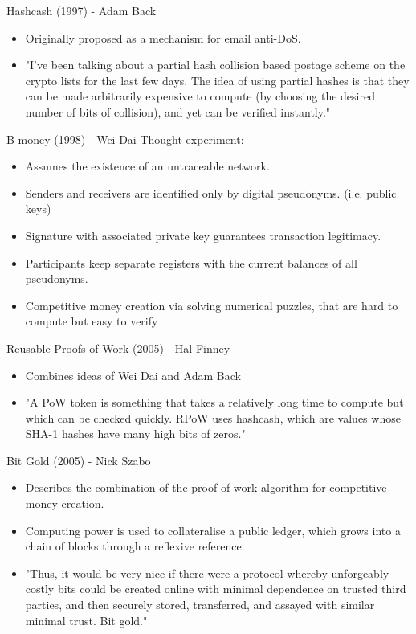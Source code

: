 \documentclass[]{beamer}
\begin{document}
\begin{frame}{Hashcash (1997) - Adam Back}
	\begin{itemize}
		\item Originally proposed as a mechanism for email anti-DoS.
		\item "I've been talking about a partial hash collision based postage scheme on the crypto lists for the last few days. The idea of using partial hashes is that they can be made arbitrarily expensive to compute (by choosing the desired number of bits of collision), and yet can be verified instantly."
	\end{itemize}
\end{frame}


\begin{frame}{B-money (1998) - Wei Dai}
Thought experiment:
	\begin{itemize}
		\item Assumes the existence of an untraceable network.
		\item Senders and receivers are identified only by digital pseudonyms. (i.e. public keys) 
		\item Signature with associated private key guarantees transaction legitimacy.
		\item Participants keep separate registers with the current balances of all pseudonyms.
		\item Competitive money creation via solving numerical puzzles, that are hard to compute but easy to verify
	\end{itemize}
\end{frame}


\begin{frame}{Reusable Proofs of Work (2005) - Hal Finney}
	\begin{itemize}
		\item Combines ideas of Wei Dai and Adam Back
		\item "A PoW token is something that takes a relatively long time to compute but which can be checked quickly. RPoW uses hashcash, which are values whose SHA-1 hashes have many high bits of zeros." 
	\end{itemize}
\end{frame}


\begin{frame}{Bit Gold (2005) - Nick Szabo}
	\begin{itemize}
		\item Describes the combination of the proof-of-work algorithm for competitive money creation.
		\item Computing power is used to collateralise a public ledger, which grows into a chain of blocks through a reflexive reference.
		\item "Thus, it would be very nice if there were a protocol whereby unforgeably costly bits could be created online with minimal dependence on trusted third parties, and then securely stored, transferred, and assayed with similar minimal trust. Bit gold."
	\end{itemize}
\end{frame}
\end{document}
